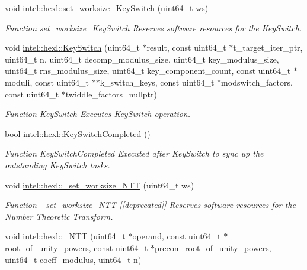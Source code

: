 \begin{DoxyCompactItemize}
void \hyperlink{namespaceintel_1_1hexl_a8ac8866d0693f8fc89f99a9197cd04cf}{intel\-::hexl\-::set\-\_\-worksize\-\_\-\-Key\-Switch} (uint64\-\_\-t ws)
\begin{DoxyCompactList}\small\item\em Function set\-\_\-worksize\-\_\-\-Key\-Switch Reserves software resources for the Key\-Switch. \end{DoxyCompactList}\item 
void \hyperlink{namespaceintel_1_1hexl_aafddb377dcb2c351cfc3e014428cfe42}{intel\-::hexl\-::\-Key\-Switch} (uint64\-\_\-t $\ast$result, const uint64\-\_\-t $\ast$t\-\_\-target\-\_\-iter\-\_\-ptr, uint64\-\_\-t n, uint64\-\_\-t decomp\-\_\-modulus\-\_\-size, uint64\-\_\-t key\-\_\-modulus\-\_\-size, uint64\-\_\-t rns\-\_\-modulus\-\_\-size, uint64\-\_\-t key\-\_\-component\-\_\-count, const uint64\-\_\-t $\ast$moduli, const uint64\-\_\-t $\ast$$\ast$k\-\_\-switch\-\_\-keys, const uint64\-\_\-t $\ast$modswitch\-\_\-factors, const uint64\-\_\-t $\ast$twiddle\-\_\-factors=nullptr)
\begin{DoxyCompactList}\small\item\em Function Key\-Switch Executes Key\-Switch operation. \end{DoxyCompactList}\item 
bool \hyperlink{namespaceintel_1_1hexl_ad36db7f99d2e70414645f961b723ab79}{intel\-::hexl\-::\-Key\-Switch\-Completed} ()
\begin{DoxyCompactList}\small\item\em Function Key\-Switch\-Completed Executed after Key\-Switch to sync up the outstanding Key\-Switch tasks. \end{DoxyCompactList}\item 
void \hyperlink{namespaceintel_1_1hexl_aeaae249dd080bb7cb40aea745c3df207}{intel\-::hexl\-::\-\_\-set\-\_\-worksize\-\_\-\-N\-T\-T} (uint64\-\_\-t ws)
\begin{DoxyCompactList}\small\item\em Function \-\_\-set\-\_\-worksize\-\_\-\-N\-T\-T \mbox{[}\mbox{[}deprecated\mbox{]}\mbox{]} Reserves software resources for the Number Theoretic Transform. \end{DoxyCompactList}\item 
void \hyperlink{namespaceintel_1_1hexl_a8d7f5d51e5d7683ea691f86ef57d2c40}{intel\-::hexl\-::\-\_\-\-N\-T\-T} (uint64\-\_\-t $\ast$operand, const uint64\-\_\-t $\ast$root\-\_\-of\-\_\-unity\-\_\-powers, const uint64\-\_\-t $\ast$precon\-\_\-root\-\_\-of\-\_\-unity\-\_\-powers, uint64\-\_\-t coeff\-\_\-modulus, uint64\-\_\-t n)
$$
\end{DoxyCompactItemize}

